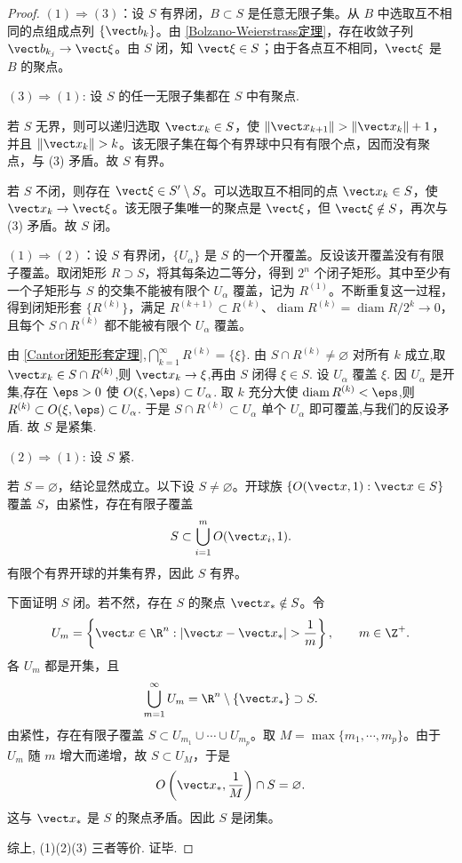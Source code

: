 \begin{proof}
$(1)\Rightarrow(3)$：设 $S$ 有界闭，$B\subset S$ 是任意无限子集。从 $B$ 中选取互不相同的点组成点列 $\{\vect b_k\}$。由 \ref{Bolzano-Weierstrass定理}，存在收敛子列 $\vect b_{k_j}\to\vect\xi$。由 $S$ 闭，知 $\vect\xi\in S$；由于各点互不相同，$\vect\xi$ 是 $B$ 的聚点。

$(3)\Rightarrow(1)$: 设 $S$ 的任一无限子集都在 $S$ 中有聚点.

若 $S$ 无界，则可以递归选取 $\vect x_k\in S$，使 $\|\vect x_{k+1}\|>\|\vect x_k\|+1$，并且 $\|\vect x_k\|>k$。该无限子集在每个有界球中只有有限个点，因而没有聚点，与 (3) 矛盾。故 $S$ 有界。

若 $S$ 不闭，则存在 $\vect\xi\in S'\setminus S$。可以选取互不相同的点 $\vect x_k\in S$，使 $\vect x_k\to\vect\xi$。该无限子集唯一的聚点是 $\vect\xi$，但 $\vect\xi\notin S$，再次与 (3) 矛盾。故 $S$ 闭。

$(1)\Rightarrow(2)$：设 $S$ 有界闭，$\{U_\alpha\}$ 是 $S$ 的一个开覆盖。反设该开覆盖没有有限子覆盖。取闭矩形 $R\supset S$，将其每条边二等分，得到 $2^n$ 个闭子矩形。其中至少有一个子矩形与 $S$ 的交集不能被有限个 $U_\alpha$ 覆盖，记为 $R^{(1)}$。不断重复这一过程，得到闭矩形套 $\{R^{(k)}\}$，满足 $R^{(k+1)}\subset R^{(k)}$、$\operatorname{diam}R^{(k)}=\operatorname{diam}R/2^k\to0$，且每个 $S\cap R^{(k)}$ 都不能被有限个 $U_\alpha$ 覆盖。

由 \ref{Cantor闭矩形套定理},$\bigcap_{k=1}^\infty R^{(k)}=\{\xi\}$. 由 $S\cap R^{(k)}\neq\varnothing$ 对所有 $k$ 成立,取 $\vect x_k\in S\cap R^{(k)}$,则 $\vect x_k\to\xi$,再由 $S$ 闭得 $\xi\in S$. 设 $U_\alpha$ 覆盖 $\xi$. 因 $U_\alpha$ 是开集,存在 $\eps>0$ 使 $O(\xi,\eps)\subset U_\alpha$. 取 $k$ 充分大使 $\operatorname{diam} R^{(k)}<\eps$,则 $R^{(k)}\subset O(\xi,\eps)\subset U_\alpha$. 于是 $S\cap R^{(k)}\subset U_\alpha$ 单个 $U_\alpha$ 即可覆盖,与我们的反设矛盾. 故 $S$ 是紧集.

$(2)\Rightarrow(1)$: 设 $S$ 紧.

若 $S=\varnothing$，结论显然成立。以下设 $S\neq\varnothing$。开球族 $\{O(\vect x,1):\vect x\in S\}$ 覆盖 $S$，由紧性，存在有限子覆盖
\[
S\subset\bigcup_{i=1}^{m}O(\vect x_i,1).
\]
有限个有界开球的并集有界，因此 $S$ 有界。

下面证明 $S$ 闭。若不然，存在 $S$ 的聚点 $\vect x_*\notin S$。令
\[
U_m=\left\{\vect x\in\R^n:|\vect x-\vect x_*|>\frac1m\right\},\qquad m\in\Z^+.
\]
各 $U_m$ 都是开集，且
\[
\bigcup_{m=1}^{\infty}U_m=\R^n\setminus\{\vect x_*\}\supset S.
\]
由紧性，存在有限子覆盖 $S\subset U_{m_1}\cup\cdots\cup U_{m_p}$。取 $M=\max\{m_1,\cdots,m_p\}$。由于 $U_m$ 随 $m$ 增大而递增，故 $S\subset U_M$，于是
\[
O\left(\vect x_*,\frac1M\right)\cap S=\varnothing.
\]
这与 $\vect x_*$ 是 $S$ 的聚点矛盾。因此 $S$ 是闭集。


综上, (1)(2)(3) 三者等价. 证毕.
\end{proof}

